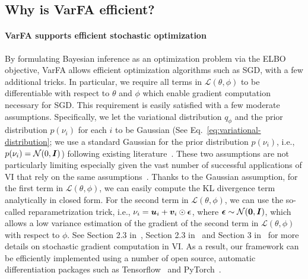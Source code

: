 \documentclass{edm_article}
\begin{document}
\subsection{Why is VarFA efficient?}
\label{sec:implementation-detail}
\vspace{-10pt}
\paragraph{VarFA supports efficient stochastic optimization}
By formulating Bayesian inference as an optimization problem via the ELBO objective, VarFA allows efficient optimization algorithms such as SGD, with a few additional tricks. In particular, we require all terms in $\mathcal{L}(\theta,\phi)$ to be differentiable with respect to $\theta$ and $\phi$ which enable gradient computation necessary for SGD. This requirement is easily satisfied with a few moderate assumptions. Specifically, we let the variational distribution $q_\phi$ and the prior distribution $p(\nu_i)$ for each $i$ to be Gaussian (See Eq.~\ref{eq:variational-distribution}; we use a standard Gaussian for the prior distribution $p(\nu_i)$, i.e., $p(\nu_i) = \mathcal{N}(0, {\bm{I}})$) following existing literature~\cite{kingma2013auto,rezende2014stochastic}. These two assumptions are not particularly limiting especially given the vast number of successful applications of VI that rely on the same assumptions~\cite{infovae,dd,siddharth2017learning,fairvae,betatcvae,betavae,factorvae}.
%
Thanks to the Gaussian assumption, for the first term in $\mathcal{L}(\theta,\phi)$, we can easily compute the KL divergence term analytically in closed form. For the second term in $\mathcal{L}(\theta,\phi)$, we can use the so-called reparametrization trick, i.e., $\nu_i = {\bm{u}}_i + {\bm{v}}_i \odot \bm{\epsilon}$, where $\bm{\epsilon}\sim\mathcal{N}(\bm{0}, {\bm{I}})$, which allows a low variance estimation of the gradient of the second term in $\mathcal{L}(\theta,\phi)$ with respect to $\phi$. See Section 2.3 in~\cite{kingma2013auto}, Section 2.3 in~\cite{kingma2019introduction} and Section 3 in~\cite{rezende2014stochastic} for more details on stochastic gradient computation in VI. As a result, our framework can be efficiently implemented using a number of open source, automatic differentiation packages such as Tensorflow~\cite{tensorflow2015-whitepaper} and PyTorch~\cite{NEURIPS2019_9015}.
\end{document}
